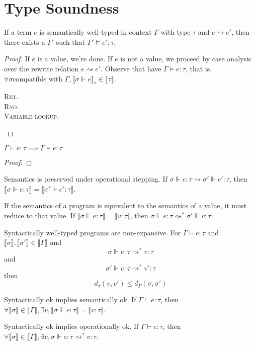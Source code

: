 \section{Type Soundness}
\begin{theorem}
If a term $e$ is semantically well-typed in context $\Gamma$ with type $\tau$ and $e \rightsquigarrow e'$, then there exists a $\Gamma'$ such that $\Gamma' \vDash e' : \tau$.
\end{theorem}
\begin{proof}
If $e$ is a value, we're done. 
If $e$ is not a value, we proceed by case analysis over the rewrite relation
$e \rightsquigarrow e'$.
Observe that have $\Gamma \vDash e : \tau$, that is, $\forall \sigma \text{
  compatible with } \Gamma, \llbracket \sigma \Vdash e \rrbracket_{\tau} \in
  \llbracket \tau \rrbracket$.
\begin{description}
  \item[\textsc{Ret.}]
  \item[\textsc{Rnd.}]
  \item[\textsc{Variable lookup.}]
\end{description}
\end{proof}

\begin{theorem}
$\Gamma \vdash e : \tau \implies \Gamma \vDash e : \tau$
\end{theorem}
\begin{proof}
\end{proof}




Semantics is preserved under operational stepping. If $\sigma \Vdash e : \tau \rightsquigarrow \sigma'
\Vdash e' : \tau$, then $\llbracket \sigma \Vdash e : \tau \rrbracket =
\llbracket \sigma' \Vdash e' : \tau \rrbracket$.

If the semantics of a program is equivalent to the semantics of a value, it must
reduce to that value. If $\llbracket \sigma \Vdash e : \tau \rrbracket =
\llbracket v : \tau \rrbracket$, then $\sigma \Vdash e : \tau
\rightsquigarrow^{*} \sigma' \Vdash v : \tau$

Syntactically well-typed programs are non-expansive. For $\Gamma \vdash e : \tau
$ and $\llbracket \sigma \rrbracket, \llbracket \sigma' \rrbracket \in
\llbracket \Gamma \rrbracket $ and
$$\sigma \Vdash e : \tau \rightsquigarrow^* v : \tau$$ 
and 
$$\sigma' \Vdash e : \tau \rightsquigarrow^* v' : \tau$$
then
$$
d_{\tau}(v, v') \leq d_{\Gamma}(\sigma, \sigma')
$$

Syntactically ok implies semantically ok. If $\Gamma \vdash e : \tau$, then
$\forall \llbracket \sigma \rrbracket \in \llbracket \Gamma \rrbracket, \exists
v, \llbracket \sigma \Vdash e : \tau \rrbracket = \llbracket v : \tau
\rrbracket$.

Syntactically ok implies operationally ok. If $\Gamma \vdash e : \tau$, then
$\forall \llbracket \sigma \rrbracket \in \llbracket \Gamma \rrbracket, \exists
v, \sigma \Vdash e : \tau \rightsquigarrow^{*} v : \tau$.

